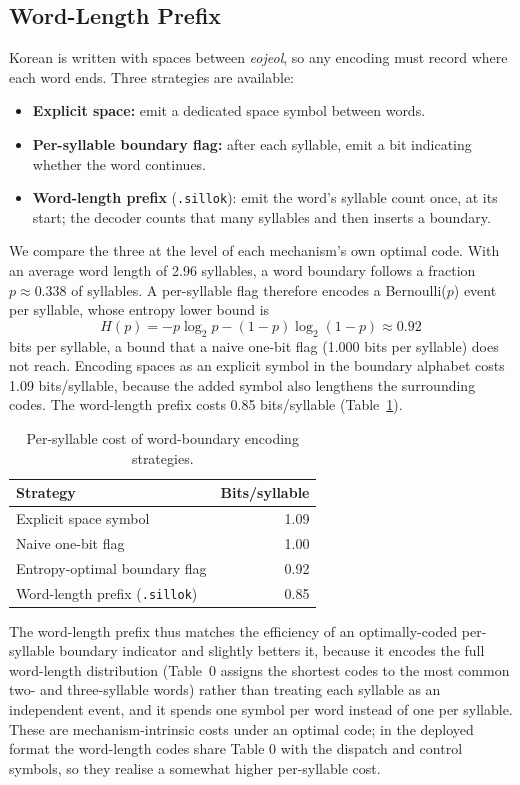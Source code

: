 \documentclass[conference]{IEEEtran}
\begin{document}
\subsection{Word-Length Prefix}

Korean is written with spaces between \emph{eojeol}, so any encoding must record
where each word ends. Three strategies are available:
\begin{itemize}
  \item \textbf{Explicit space:} emit a dedicated space symbol between words.
  \item \textbf{Per-syllable boundary flag:} after each syllable, emit a bit
  indicating whether the word continues.
  \item \textbf{Word-length prefix} (\texttt{.sillok}): emit the word's syllable
  count once, at its start; the decoder counts that many syllables and then
  inserts a boundary.
\end{itemize}

We compare the three at the level of each mechanism's own optimal code. With an
average word length of 2.96 syllables, a word boundary follows a fraction
$p \approx 0.338$ of syllables. A per-syllable flag therefore encodes a
Bernoulli($p$) event per syllable, whose entropy lower bound is
\[
  H(p) = -p\log_2 p - (1-p)\log_2(1-p) \approx 0.92
\]
bits per syllable, a bound that a naive one-bit flag (1.000 bits per syllable)
does not reach. Encoding
spaces as an explicit symbol in the boundary alphabet costs 1.09 bits/syllable,
because the added symbol also lengthens the surrounding codes. The word-length
prefix costs 0.85 bits/syllable (Table~\ref{tab:wb}).

\begin{table}[H]
\centering
\caption{Per-syllable cost of word-boundary encoding strategies.}
\label{tab:wb}
\begin{tabular}{lr}
\toprule
Strategy & Bits/syllable \\
\midrule
Explicit space symbol            & 1.09 \\
Naive one-bit flag               & 1.00 \\
Entropy-optimal boundary flag    & 0.92 \\
Word-length prefix (\texttt{.sillok}) & 0.85 \\
\bottomrule
\end{tabular}
\end{table}

The word-length prefix thus matches the efficiency of an optimally-coded
per-syllable boundary indicator and slightly betters it, because it encodes the
full word-length distribution (Table~0 assigns the shortest codes to the most
common two- and three-syllable words) rather than treating each syllable as an
independent event, and it spends one symbol per word instead of one per
syllable. These are mechanism-intrinsic costs under an optimal code; in the
deployed format the word-length codes share Table 0 with the dispatch and
control symbols, so they realise a somewhat higher per-syllable cost.
\end{document}
